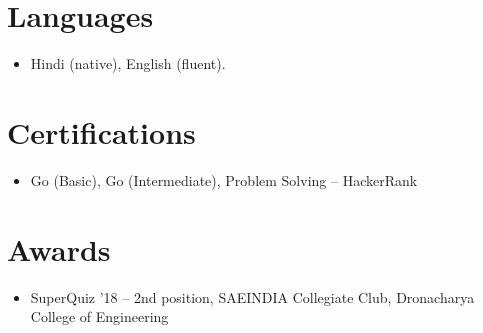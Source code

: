 \documentclass[11pt,a4paper,sans]{moderncv}
\begin{document}

\section{Languages}
\vspace{1pt}
\begin{itemize}
\item Hindi (native), English (fluent).
\end{itemize}


\section{Certifications}
\vspace{1pt}
\begin{itemize}
\item Go (Basic), Go (Intermediate), Problem Solving -- HackerRank
\end{itemize}


\enlargethispage{3\baselineskip}
\section{Awards}
\vspace{1pt}
\begin{itemize}
\item SuperQuiz '18 -- 2nd position, SAEINDIA Collegiate Club, Dronacharya College of Engineering
\end{itemize}
\end{document}
